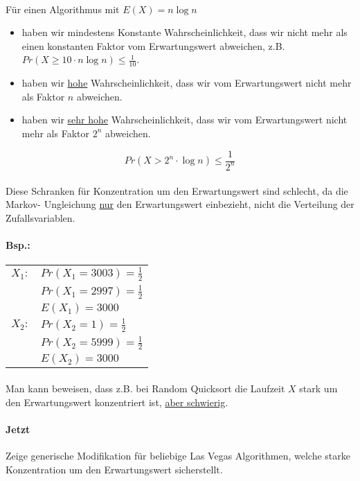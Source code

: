 \paragraph*{} Für einen Algorithmus mit $E(X) = n \log n$
\begin{itemize}
	\item haben wir mindestens Konstante Wahrscheinlichkeit, dass wir nicht mehr als einen konstanten Faktor vom Erwartungswert abweichen, z.B. $Pr(X \geq 10 \cdot n \log n) \leq \frac{1}{10}$.
	\item haben wir \underline{hohe} Wahrscheinlichkeit, dass wir vom Erwartungswert nicht mehr als Faktor $n$ abweichen.
	\item haben wir \underline{sehr hohe} Wahrscheinlichkeit, dass wir vom Erwartungswert nicht mehr als Faktor $2^n$ abweichen.
\end{itemize}

$$ Pr(X > 2^n \cdot \log n) \leq \frac{1}{2^n} $$

\paragraph*{} Diese Schranken für Konzentration um den Erwartungswert sind schlecht, da die Markov- Ungleichung \underline{nur} den Erwartungswert einbezieht, nicht die Verteilung der Zufallsvariablen.

\paragraph*{Bsp.:}
\begin{tabular}{l l}
$X_1 :$ & $Pr(X_1 = 3003) = \frac{1}{2}$ \\
 & $Pr(X_1 = 2997) = \frac{1}{2}$ \\
 & $E(X_1) = 3000$ \\
$X_2 :$ & $Pr(X_2 = 1) = \frac{1}{2}$ \\
 & $Pr(X_2 = 5999) = \frac{1}{2}$ \\
 & $E(X_2) = 3000$ \\
\end{tabular} 

\paragraph*{} Man kann beweisen, dass z.B. bei Random Quicksort die Laufzeit $X$ stark um den Erwartungswert konzentriert ist,  \underline{aber schwierig}.

\paragraph*{Jetzt} Zeige generische Modifikation für beliebige Las Vegas Algorithmen, welche starke Konzentration um den Erwartungswert sicherstellt.

